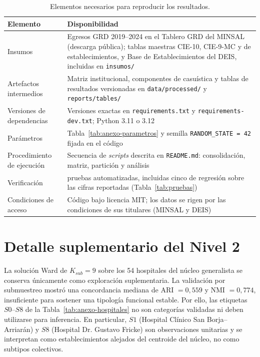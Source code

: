 \begin{table}[htbp]
\centering
\caption{Elementos necesarios para reproducir los resultados.}
\label{tab:anexo-reproducibilidad}
\small
\begin{tabularx}{\textwidth}{>{\raggedright\arraybackslash}p{3.3cm} >{\raggedright\arraybackslash}X}
\toprule
\textbf{Elemento} & \textbf{Disponibilidad} \\
\midrule
Insumos & Egresos GRD 2019--2024 en el Tablero GRD del MINSAL (descarga pública); tablas maestras CIE-10, CIE-9-MC y de establecimientos, y Base de Establecimientos del DEIS, incluidas en \texttt{insumos/} \\
Artefactos intermedios & Matriz institucional, componentes de casuística y tablas de resultados versionadas en \texttt{data/processed/} y \texttt{reports/tables/} \\
Versiones de dependencias & Versiones exactas en \texttt{requirements.txt} y \texttt{requirements-dev.txt}; Python 3.11 o 3.12 \\
Parámetros & Tabla~\ref{tab:anexo-parametros} y semilla \texttt{RANDOM\_STATE = 42} fijada en el código \\
Procedimiento de ejecución & Secuencia de \textit{scripts} descrita en \texttt{README.md}: consolidación, matriz, partición y análisis \\
Verificación & 62 pruebas automatizadas, incluidas cinco de regresión sobre las cifras reportadas (Tabla~\ref{tab:pruebas}) \\
Condiciones de acceso & Código bajo licencia MIT; los datos se rigen por las condiciones de sus titulares (MINSAL y DEIS) \\
\bottomrule
\end{tabularx}
\end{table}

\section{Detalle suplementario del Nivel 2}
\label{anexo:nivel2-exploratorio}

La solución Ward de $K_{sub}=9$ sobre los 54 hospitales del núcleo generalista
se conserva únicamente como exploración suplementaria. La validación por
submuestreo mostró una concordancia mediana de ARI $=0{,}559$ y NMI $=0{,}774$,
insuficiente para sostener una tipología funcional estable. Por ello, las
etiquetas $S0$--$S8$ de la Tabla~\ref{tab:anexo-hospitales} no son categorías
validadas ni deben utilizarse para inferencia. En particular, $S1$ (Hospital
Clínico San Borja--Arriarán) y $S8$ (Hospital Dr. Gustavo Fricke) son
observaciones unitarias y se interpretan como establecimientos alejados del
centroide del núcleo, no como subtipos colectivos.

